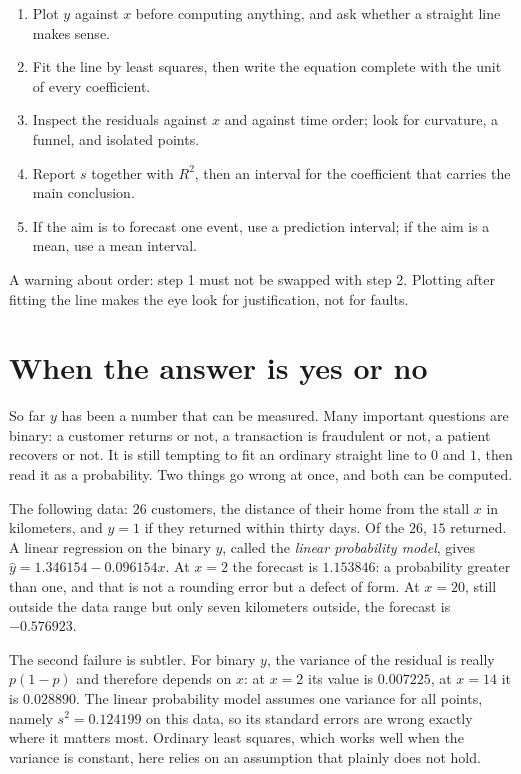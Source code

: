 \begin{resep}
\begin{enumerate}
  \item Plot $y$ against $x$ before computing anything, and ask whether a straight line makes
        sense.
  \item Fit the line by least squares, then write the equation complete with the unit of every
        coefficient.
  \item Inspect the residuals against $x$ and against time order; look for curvature, a funnel,
        and isolated points.
  \item Report $s$ together with $R^2$, then an interval for the coefficient that carries the
        main conclusion.
  \item If the aim is to forecast one event, use a prediction interval; if the aim is a mean,
        use a mean interval.
\end{enumerate}
A warning about order: step 1 must not be swapped with step 2. Plotting after fitting the line
makes the eye look for justification, not for faults.
\end{resep}

\section{When the answer is yes or no}

So far $y$ has been a number that can be measured. Many important questions are binary: a
customer returns or not, a transaction is fraudulent or not, a patient recovers or not. It is
still tempting to fit an ordinary straight line to $0$ and $1$, then read it as a probability.
Two things go wrong at once, and both can be computed.

The following data: $26$ customers, the distance of their home from the stall $x$ in kilometers,
and $y=1$ if they returned within thirty days. Of the $26$, $15$ returned. A linear regression
on the binary $y$, called the \emph{linear probability model}, gives
$\hat y=1.346154-0.096154x$. At $x=2$ the forecast is $1.153846$: a probability greater than
one, and that is not a rounding error but a defect of form. At $x=20$, still outside the data
range but only seven kilometers outside, the forecast is $-0.576923$.

The second failure is subtler. For binary $y$, the variance of the residual is really $p(1-p)$
and therefore depends on $x$: at $x=2$ its value is $0.007225$, at $x=14$ it is $0.028890$. The
linear probability model assumes one variance for all points, namely $s^2=0.124199$ on this
data, so its standard errors are wrong exactly where it matters most.
Ordinary least squares, which works well when the variance is constant, here relies on an
assumption that plainly does not hold.


